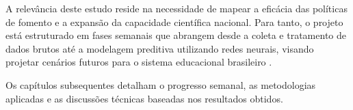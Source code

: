 \documentclass[11pt,a4paper]{article}
\begin{document}
A relevância deste estudo reside na necessidade de mapear a eficácia das políticas de fomento e a expansão da capacidade científica nacional. Para tanto, o projeto está estruturado em fases semanais que abrangem desde a coleta e tratamento de dados brutos até a modelagem preditiva utilizando redes neurais, visando projetar cenários futuros para o sistema educacional brasileiro \cite{Silva2023}.

Os capítulos subsequentes detalham o progresso semanal, as metodologias aplicadas e as discussões técnicas baseadas nos resultados obtidos.

\newpage





{}

\end{document}
